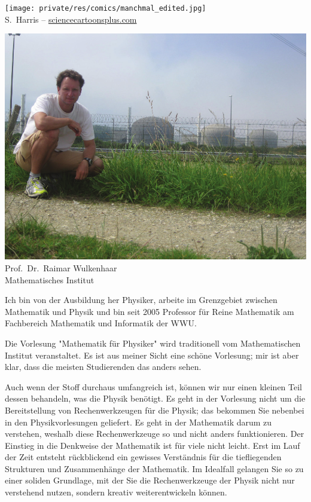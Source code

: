 \begin{multicols}{2}
\begin{center}
\texttt{[image: private/res/comics/manchmal\_edited.jpg]}\\
{\footnotesize 
S.~Harris – \url{sciencecartoonsplus.com}
}
\end{center}

\end{multicols}

\vfill

\newpage

\begin{multicols}{2}
\begin{center}
	\includegraphics[width=\columnwidth, height=0.35\textheight]{res/vorstellungsfotos/wulkenhaar.png}\\
	\smallskip
 	Prof.\ Dr.\ Raimar Wulkenhaar\\
	Mathematisches Institut
\end{center}

Ich bin von der Ausbildung her Physiker, arbeite im Grenzgebiet zwischen Mathematik und Physik und bin seit 2005 Professor für Reine Mathematik am Fachbereich Mathematik und Informatik der WWU.

Die Vorlesung "Mathematik für Physiker" wird traditionell vom Mathematischen Institut veranstaltet. Es ist aus meiner Sicht eine schöne Vorlesung; mir ist aber klar, dass die meisten Studierenden das anders sehen.

Auch wenn der Stoff durchaus umfangreich ist, können wir nur einen kleinen Teil dessen behandeln, was die Physik benötigt. Es geht in der Vorlesung nicht um die Bereitstellung von Rechenwerkzeugen für die Physik; das bekommen Sie nebenbei in den Physikvorlesungen geliefert. Es geht in der Mathematik darum zu verstehen, weshalb diese Rechenwerkzeuge so und nicht anders funktionieren. Der Einstieg in die Denkweise der Mathematik ist für viele nicht leicht. Erst im Lauf der Zeit entsteht rückblickend ein gewisses Verständnis für die tiefliegenden Strukturen und Zusammenhänge der Mathematik. Im Idealfall gelangen Sie so zu einer soliden Grundlage, mit der Sie die Rechenwerkzeuge der Physik nicht nur verstehend nutzen, sondern kreativ weiterentwickeln können.



\end{multicols}
